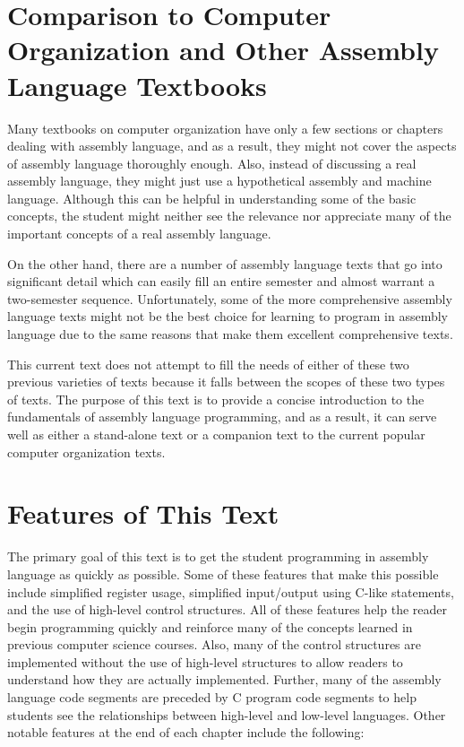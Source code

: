 \documentclass[10pt]{book}
\begin{document}
\section{Comparison to Computer Organization and Other Assembly Language Textbooks}
Many textbooks on computer organization have only a few sections or chapters dealing with assembly language, and as a result, they might not cover the aspects of assembly language thoroughly enough. Also, instead of discussing a real assembly language, they might just use a hypothetical assembly and machine language. Although this can be helpful in understanding some of the basic concepts, the student might neither see the relevance nor appreciate many of the important concepts of a real assembly language.

On the other hand, there are a number of assembly language texts that go into significant detail which can easily fill an entire semester and almost warrant a two-semester sequence. Unfortunately, some of the more comprehensive assembly language texts might not be the best choice for learning to program in assembly language due to the same reasons that make them excellent comprehensive texts.

This current text does not attempt to fill the needs of either of these two previous varieties of texts because it falls between the scopes of these two types of texts. The purpose of this text is to provide a concise introduction to the fundamentals of assembly language programming, and as a result, it can serve well as either a stand-alone text or a companion text to the current popular computer organization texts.

\section{Features of This Text}
The primary goal of this text is to get the student programming in assembly language as quickly as possible. Some of these features that make this possible include simplified register usage, simplified input/output using C-like statements, and the use of high-level control structures. All of these features help the reader begin programming quickly and reinforce many of the concepts learned in previous computer science courses. Also, many of the control structures are implemented without the use of high-level structures to allow readers to understand how they are actually implemented. Further, many of the assembly language code segments are preceded by C program code segments to help students see the relationships between high-level and low-level languages. Other notable features at the end of each chapter include the following:
\end{document}
